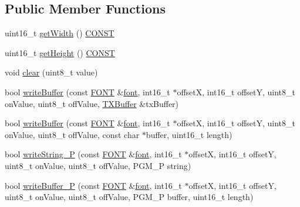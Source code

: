 \subsection*{Public Member Functions}
\begin{DoxyCompactItemize}
\item 
uint16\-\_\-t \hyperlink{classflame_1_1_display___monochrome_ad0f4efba436d8aa9111891ea7b95312e}{get\-Width} () \hyperlink{io_8h_a0c33b494a68ce28497e7ce8e5e95feff}{C\-O\-N\-S\-T}
\item 
uint16\-\_\-t \hyperlink{classflame_1_1_display___monochrome_aca8bb03d86980657ee953ce506a75fcc}{get\-Height} () \hyperlink{io_8h_a0c33b494a68ce28497e7ce8e5e95feff}{C\-O\-N\-S\-T}
\item 
void \hyperlink{classflame_1_1_display___monochrome_a7c38727d187106abe6027d1ca1bb8b14}{clear} (uint8\-\_\-t value)
\item 
bool \hyperlink{classflame_1_1_display___monochrome_a0754b3857615d04dce50e5e52321674f}{write\-Buffer} (const \hyperlink{namespaceflame_a05350b61d7b7be486d5e367522316a33}{F\-O\-N\-T} \&\hyperlink{structflame_1_1font}{font}, int16\-\_\-t $\ast$offset\-X, int16\-\_\-t offset\-Y, uint8\-\_\-t on\-Value, uint8\-\_\-t off\-Value, \hyperlink{classflame_1_1_t_x_buffer}{T\-X\-Buffer} \&tx\-Buffer)
\item 
bool \hyperlink{classflame_1_1_display___monochrome_a30562aac06dd7a44c9f0d5e9183f6481}{write\-Buffer} (const \hyperlink{namespaceflame_a05350b61d7b7be486d5e367522316a33}{F\-O\-N\-T} \&\hyperlink{structflame_1_1font}{font}, int16\-\_\-t $\ast$offset\-X, int16\-\_\-t offset\-Y, uint8\-\_\-t on\-Value, uint8\-\_\-t off\-Value, const char $\ast$buffer, uint16\-\_\-t length)
\item 
bool \hyperlink{classflame_1_1_display___monochrome_a4149d7999c78ec01474f1e27ba5f4009}{write\-String\-\_\-\-P} (const \hyperlink{namespaceflame_a05350b61d7b7be486d5e367522316a33}{F\-O\-N\-T} \&\hyperlink{structflame_1_1font}{font}, int16\-\_\-t $\ast$offset\-X, int16\-\_\-t offset\-Y, uint8\-\_\-t on\-Value, uint8\-\_\-t off\-Value, P\-G\-M\-\_\-\-P string)
\item 
bool \hyperlink{classflame_1_1_display___monochrome_a5f901899fdd1d93b88deeedc59b214a4}{write\-Buffer\-\_\-\-P} (const \hyperlink{namespaceflame_a05350b61d7b7be486d5e367522316a33}{F\-O\-N\-T} \&\hyperlink{structflame_1_1font}{font}, int16\-\_\-t $\ast$offset\-X, int16\-\_\-t offset\-Y, uint8\-\_\-t on\-Value, uint8\-\_\-t off\-Value, P\-G\-M\-\_\-\-P buffer, uint16\-\_\-t length)
\item 

\end{DoxyCompactItemize}
